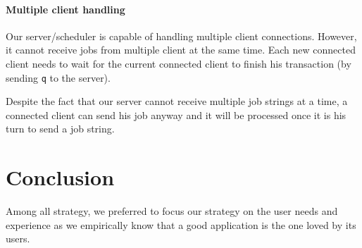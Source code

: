 \documentclass[a4paper,11pt]{article}
\begin{document}
\paragraph{Multiple client handling}

Our server/scheduler is capable of handling multiple client connections. However, it cannot receive jobs from multiple client at the same time. Each new connected client needs to wait for the current connected client to finish his transaction (by sending \texttt{q} to the server).

Despite the fact that our server cannot receive multiple job strings at a time, a connected client can send his job anyway and it will be processed once it is his turn to send a job string.

\clearpage

\section{Conclusion}

Among all strategy, we preferred to focus our strategy on the user needs and experience as we empirically know that a good application is the one loved by its users.

\clearpage




\newpage

\end{document}
